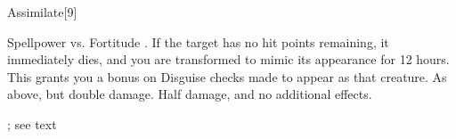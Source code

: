 \begin{spellsection}{Assimilate}[9]
    \begin{spellheader}
    \end{spellheader}
    \begin{spellcontent}
        \begin{spelltargetinginfo}
        \end{spelltargetinginfo}
        \begin{spelleffects}
            \begin{spellattack}{Spellpower vs. Fortitude}
                \spellsuccess {}. If the target has no hit points remaining, it immediately dies, and you are transformed to mimic its appearance for 12 hours. This grants you a  bonus on Disguise checks made to appear as that creature.
                \spellcritical As above, but double damage.
                \spellfailure Half damage, and no additional effects.
            \end{spellattack}
            \spelldur \durext; see text
        \end{spelleffects}
    \end{spellcontent}
    \begin{spellfooter}
        \miscastrandom
    \end{spellfooter}
\end{spellsection}

